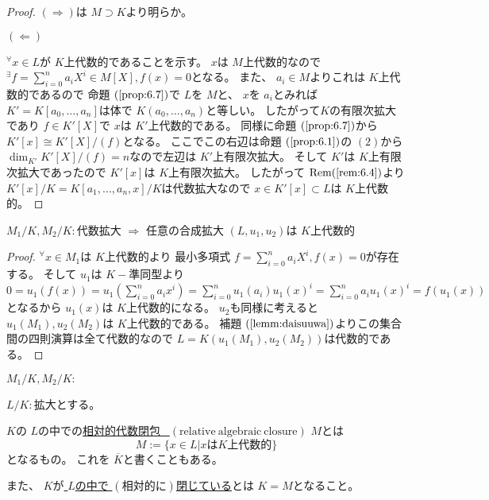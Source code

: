 \documentclass[../master_galois_theory]{subfiles}
\begin{document}
\begin{proof}
  $(\Rightarrow)$は $M \supset K$より明らか。

  $(\Leftarrow)$

  ${}^\forall x \in L$が $K$上代数的であることを示す。
  $x$は $M$上代数的なので ${}^\exists f = \sum_{i=0}^n a_i X^i \in M[X] , f(x) = 0$となる。
  また、 $a_i \in M$よりこれは $K$上代数的であるので
  命題 $(\mathrm{\ref{prop:6.7}})$で $L$を $M$と、 $x$を $a_i$とみれば
  $K' = K[a_0 , \dots , a_n]$は体で $K(a_0 , \dots , a_n)$と等しい。
  したがって$K$の有限次拡大であり $f \in K'[X]$で $x$は $K'$上代数的である。
  同様に命題 $(\mathrm{\ref{prop:6.7}})$から $K'[x] \cong K'[X]/(f)$となる。
  ここでこの右辺は命題 $(\mathrm{\ref{prop:6.1}})$の $(2)$から
  $\dim_{K'} K'[X]/(f) = n$なので左辺は $K'$上有限次拡大。
  そして $K'$は $K$上有限次拡大であったので $K'[x]$は $K$上有限次拡大。
  したがって $\mathrm{Rem} (\mathrm{\ref{rem:6.4}})$より
  $K'[x]/K = K[a_1 , \dots , a_n , x]/K$は代数拡大なので
  $x \in K'[x] \subset L$は $K$上代数的。
\end{proof}

\begin{prop}
  $M_1/K , M_2/K:$代数拡大 $\Rightarrow$ 任意の合成拡大 $(L,u_1,u_2)$は $K$上代数的
\end{prop}

\begin{proof}
  ${}^\forall x \in M_1$は $K$上代数的より
  最小多項式 $f = \sum_{i=0}^n a_i X^i , f(x) = 0$が存在する。
  そして $u_1$は $K-$準同型より $0 = u_1(f(x)) = u_1(\sum_{i=0}^n a_i x^i) = \sum_{i=0}^n u_1(a_i) u_1(x)^i = \sum_{i=0}^n a_i u_1(x)^i = f(u_1(x))$
  となるから $u_1(x)$は $K$上代数的になる。
  $u_2$も同様に考えると $u_1(M_1) , u_2(M_2)$は $K$上代数的である。
  補題 $(\mathrm{\ref{lemm:daisuuwa}})$よりこの集合間の四則演算は全て代数的なので
  $L = K(u_1(M_1) , u_2(M_2))$は代数的である。
\end{proof}

\begin{prop}
  $M_1/K , M_2/K:$
\end{prop}

\begin{defi}
  $L/K:$拡大とする。

  $K$の $L$の中での\underline{相対的代数閉包 \  $(\mathrm{relative \  algebraic \  closure})$} $M$とは
  \[
  M := \{ x \in L | x は K上代数的\}
  \]
  となるもの。
  これを $\overline{K}$と書くこともある。

  また、 $K$が\underline{ $L$の中で $(相対的に)$閉じている}とは
  $K = M$となること。
\end{defi}
\end{document}
